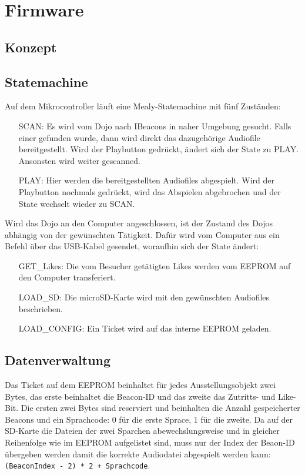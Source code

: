 \chapter{Firmware}
\label{Firmware}
\thispagestyle{fancy} 
\section{Konzept}
\section{Statemachine}
Auf dem Mikrocontroller läuft eine Mealy-Statemachine mit fünf Zuständen:\\
\begin{itemize}[leftmargin=3.2cm]
\item[SCAN:] Es wird vom Dojo nach IBeacons in naher Umgebung gesucht. Falls einer gefunden wurde, dann wird direkt das dazugehörige Audiofile bereitgestellt. Wird der Playbutton gedrückt, ändert sich der State zu PLAY. Ansonsten wird weiter gescanned.
\item[PLAY:] Hier werden die bereitgestellten Audiofiles abgespielt. Wird der Playbutton nochmals gedrückt, wird das Abspielen abgebrochen und der State wechselt wieder zu SCAN.
\end{itemize}
Wird das Dojo an den Computer angeschlossen, ist der Zustand des Dojos abhängig von der gewünschten Tätigkeit. Dafür wird vom Computer aus ein Befehl über das USB-Kabel gesendet, woraufhin sich der State ändert:
\begin{itemize}[leftmargin=3.2cm]
\item[GET\_Likes:] Die vom Besucher getätigten Likes werden vom EEPROM auf den Computer transferiert.
\item[LOAD\_SD:] Die microSD-Karte wird mit den gewünschten Audiofiles beschrieben.
\item[LOAD\_CONFIG:] Ein Ticket wird auf das interne EEPROM geladen.
\end{itemize}
 \section{Datenverwaltung}
Das Ticket auf dem EEPROM beinhaltet für jedes Ausstellungsobjekt zwei Bytes, das erste beinhaltet die Beacon-ID und das zweite das Zutritts- und Like-Bit.
Die ersten zwei Bytes sind reserviert und beinhalten die Anzahl gespeicherter Beacons und ein Sprachcode: 0 für die erste Sprace, 1 für die zweite.
Da auf der SD-Karte die Dateien der zwei Sparchen abewechslungsweise und in gleicher Reihenfolge wie im EEPROM aufgelistet sind, muss nur der Index der Beaon-ID übergeben werden damit die korrekte Audiodatei abgespielt werden kann: \\
\texttt{(BeaconIndex - 2) * 2 + Sprachcode}.
